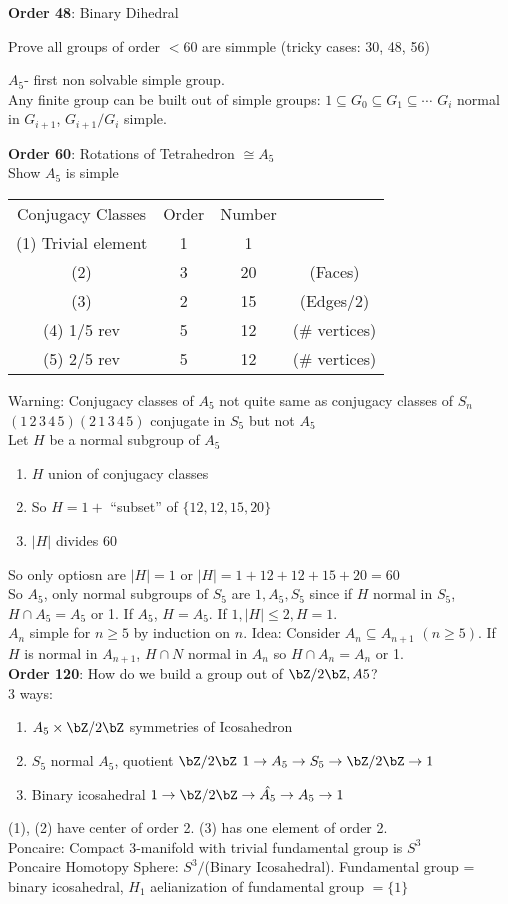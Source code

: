 \noindent
\textbf{Order 48}: Binary Dihedral \\
\begin{example}
    Prove all groups of order $<60$ are simmple (tricky cases: 30, 48, 56) 
\end{example}

\noindent
$A_5$- first non solvable simple group. \\
Any finite group can be built out of simple groups: $1 \subseteq G_0 \subseteq G_1 \subseteq \cdots$ $G_i$ normal in $G_{i+1}$, $G_{i+1}/G_i$ simple. 

\noindent
\textbf{Order 60}: Rotations of Tetrahedron $\cong A_5$ \\
Show $A_5$ is simple 
\begin{tabular}{cccc}
    Conjugacy Classes & Order & Number &\\
    (1) Trivial element & 1 & 1 & \\ 
    (2) & 3 & 20 & (Faces) \\
    (3) & 2 & 15 & (Edges/2) \\ 
    (4) 1/5 rev & 5 & 12 & (\# vertices) \\
    (5) 2/5 rev & 5 & 12 & (\# vertices) 
\end{tabular}
Warning: Conjugacy classes of $A_5$ not quite same as conjugacy classes of $S_n$ \\
$(1 \, 2 \, 3 \, 4 \, 5)(2 \, 1 \, 3 \, 4 \, 5)$ conjugate in $S_5$ but not $A_5$ \\
Let $H$ be a normal subgroup of $A_5$
\begin{enumerate}
    \item $H$ union of conjugacy classes 
    \item So $H = 1 + $ ``subset'' of $\{12, 12, 15, 20\}$ 
    \item $|H|$ divides 60 
\end{enumerate}
So only optiosn are $|H|=1$ or $|H|= 1 + 12 + 12 + 15 + 20=60$ \\
So $A_5$, only normal subgroups of $S_5$ are $1, A_5, S_5$ since if $H$ normal in $S_5$, $H \cap A_5 = A_5$ or 1. If $A_5$, $H = A_5$. If $1, |H| \le 2, H = 1$. \\
$A_n$ simple for $n \ge 5$ by induction on $n$. Idea: Consider $A_n \subseteq A_{n+1}$ $(n \ge 5)$. If $H$ is normal in $A_{n+1}$, $H \cap N$ normal in $A_n$ so $H \cap A_n = A_n$ or 1. \\

\noindent
\textbf{Order 120}: How do we build a group out of $\bZ/2\bZ, A5$? \\
3 ways: 
\begin{enumerate}
    \item $A_5 \times \bZ/2\bZ$ \quad symmetries of Icosahedron
    \item $S_5$ \quad normal $A_5$, quotient $\bZ/2\bZ$ \quad $1 \to A_5 \to S_5 \to \bZ/2\bZ \to 1$ 
    \item Binary icosahedral \quad $1 \to \bZ/2\bZ \to \hat{A_5} \to A_5 \to 1$ 
\end{enumerate} 
(1), (2) have center of order 2. (3) has one element of order 2. \\

\noindent
Poncaire: Compact 3-manifold with trivial fundamental group is $S^3$ \\
Poncaire Homotopy Sphere: $S^3/$(Binary Icosahedral). Fundamental group = binary icosahedral, $H_1$ aelianization of fundamental group $=\{1\}$ 